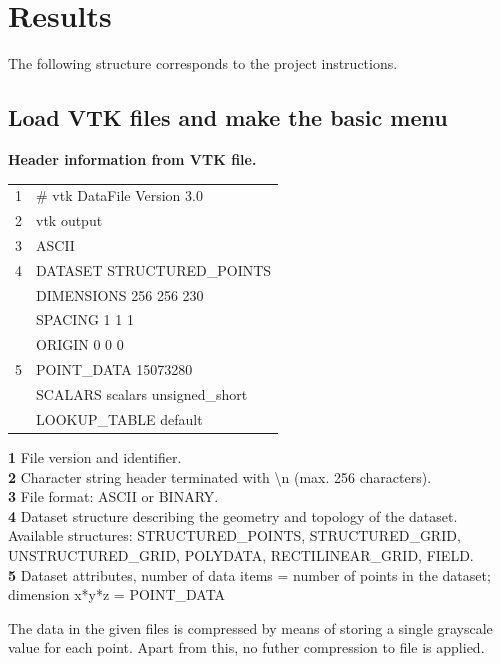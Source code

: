 \chapter{Results}
The following structure corresponds to the project instructions.


\section{Load VTK files and make the basic menu} 

\textbf{Header information from VTK file.}

\begin{table}[h]
	\ttfamily
	\small
	\begin{tabular}{l|l}
		1 & \# vtk DataFile Version 3.0     \\
		2 & vtk output                      \\
		3 & ASCII                           \\
		4 & DATASET STRUCTURED\_POINTS      \\
		& DIMENSIONS 256 256 230          \\
		& SPACING 1 1 1                   \\
		& ORIGIN 0 0 0                    \\
		5 & POINT\_DATA 15073280            \\
		& SCALARS scalars unsigned\_short \\
		& LOOKUP\_TABLE default          
	\end{tabular}
\end{table}

\noindent
\textbf{1} File version and identifier.\\
\textbf{2} Character string header terminated with \textbackslash n (max. 256 characters).\\
\textbf{3} File format: ASCII or BINARY.\\
\textbf{4} Dataset structure describing the geometry and topology of the dataset. Available structures: STRUCTURED\_POINTS, STRUCTURED\_GRID, UNSTRUCTURED\_GRID, POLYDATA, RECTILINEAR\_GRID, FIELD.\\
\textbf{5} Dataset attributes, number of data items = number of points in the dataset; dimension x*y*z = POINT\_DATA

The data in the given files is compressed by means of storing a single grayscale value for each point. Apart from this, no futher compression to file is applied.

